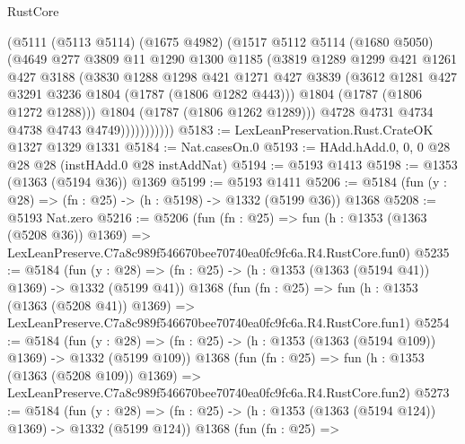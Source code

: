 \begin{lexlean}{RustCore}
\begin{coremodule}
                    (@5111
                      (@5113 @5114)
                      (@1675 @4982)
                      (@1517
                        @5112
                        @5114
                        (@1680 @5050)
                        (@4649
                          @277
                          @3809
                          @11
                          @1290
                          @1300
                          @1185
                          (@3819
                            @1289
                            @1299
                            @421
                            @1261
                            @427
                            @3188
                            (@3830
                              @1288
                              @1298
                              @421
                              @1271
                              @427
                              @3839
                              (@3612 @1281 @427 @3291 @3236 @1804 (@1787 (@1806 @1282 @443)))
                              @1804
                              (@1787 (@1806 @1272 @1288)))
                            @1804
                            (@1787 (@1806 @1262 @1289)))
                          @4728
                          @4731
                          @4734
                          @4738
                          @4743
                          @4749)))))))))))
@5183 := LexLeanPreservation.Rust.CrateOK @1327 @1329 @1331
@5184 := Nat.casesOn.{0}
@5193 := HAdd.hAdd.{0, 0, 0} @28 @28 @28 (instHAdd.{0} @28 instAddNat)
@5194 := @5193 @1413
@5198 := @1353 (@1363 (@5194 @36)) @1369
@5199 := @5193 @1411
@5206 := @5184 (fun (y : @28) => (fn : @25) -> (h : @5198) -> @1332 (@5199 @36)) @1368
@5208 := @5193 Nat.zero
@5216 := @5206
    (fun (fn : @25) =>
    fun (h : @1353 (@1363 (@5208 @36)) @1369) =>
    LexLeanPreserve.C7a8c989f546670bee70740ea0fc9fc6a.R4.RustCore.fun0)
@5235 := @5184
    (fun (y : @28) => (fn : @25) -> (h : @1353 (@1363 (@5194 @41)) @1369) -> @1332 (@5199 @41))
    @1368
    (fun (fn : @25) =>
    fun (h : @1353 (@1363 (@5208 @41)) @1369) =>
    LexLeanPreserve.C7a8c989f546670bee70740ea0fc9fc6a.R4.RustCore.fun1)
@5254 := @5184
    (fun (y : @28) => (fn : @25) -> (h : @1353 (@1363 (@5194 @109)) @1369) -> @1332 (@5199 @109))
    @1368
    (fun (fn : @25) =>
    fun (h : @1353 (@1363 (@5208 @109)) @1369) =>
    LexLeanPreserve.C7a8c989f546670bee70740ea0fc9fc6a.R4.RustCore.fun2)
@5273 := @5184
    (fun (y : @28) => (fn : @25) -> (h : @1353 (@1363 (@5194 @124)) @1369) -> @1332 (@5199 @124))
    @1368
    (fun (fn : @25) =>

\end{coremodule}
\end{lexlean}
